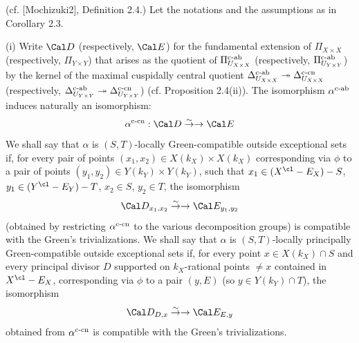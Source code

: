  (cf. [Mochizuki2], Definition 2.4.) 
Let the notations and the assumptions as in Corollary 2.3. 

\noindent
{\rm (i)} Write $\Cal D$ (respectively, $\Cal E$) for the  
fundamental extension of $\Pi _{X\times X}$ (respectively, 
$\Pi _{Y\times Y}$) that arises as the 
quotient of $\Pi _{U_{X\times X}}^{\text{\rm c-ab}}$ (respectively, $\Pi _{U_
{Y\times Y}}^{\text{\rm c-ab}}$) by the kernel of the maximal cuspidally central
quotient $\Delta _{U_{X\times X}}^{\text{\rm c-ab}}\twoheadrightarrow 
\Delta _{U_{X\times X}}^{\text{\rm c-cn}}$ (respectively,  $\Delta _{U_{Y\times Y}}
^{\text{\rm c-ab}}\twoheadrightarrow \Delta _{U_{Y\times Y}}^{\text{\rm c-cn}}$) 
(cf. Proposition 2.4(ii)). The isomorphism 
$\alpha ^{\text{\rm c-ab}}$ induces naturally an isomorphism:
$$\alpha ^{\text{\rm c-cn}}:\Cal D\isom \Cal E$$
We shall say that $\alpha$ is $(S,T)$-locally Green-compatible 
outside exceptional sets if, for
every pair of points $(x_1,x_2)\in X(k_X)\times X(k_X)$ corresponding via 
$\phi$ to a pair of points $(y_1,y_2)\in Y(k_Y)
\times Y(k_Y)$, such that $x_1\in (X^{\cl}-E_X)-S$, 
$y_1\in (Y^{\cl}-E_Y)-T$, $x_2\in S$, $y_2\in T$, the isomorphism
$$\Cal D_{x_1,x_2}\isom \Cal E_{y_1,y_2}$$
(obtained by restricting $\alpha ^{\text{\rm c-cn}}$ to the various decomposition groups) 
is compatible with the 
Green's trivializations. We shall say that $\alpha$ is 
$(S,T)$-locally principally
Green-compatible outside exceptional sets 
if, for every point $x\in X(k_X)\cap S$ and 
every %
principal divisor
$D$ supported on $k_X$-rational points 
$\neq x$ contained in $X^{\cl}-E_X$, 
corresponding via $\phi$ to a pair $(y,E)$ (so $y\in Y(k_Y)\cap T$), 
the isomorphism
$$\Cal D_{D,x}\isom \Cal E_{E,y}$$
obtained from $\alpha^{\text{\rm c-cn}}$
is compatible with the Green's trivializations.

